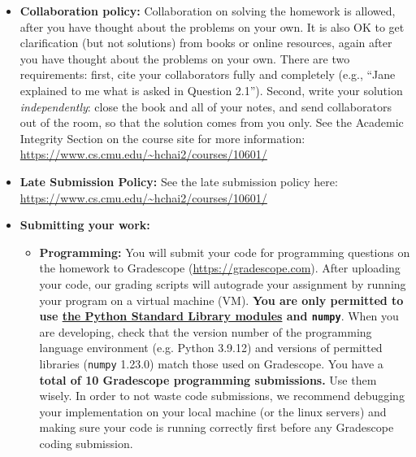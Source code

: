 \documentclass[11pt,addpoints,answers]{exam}
\begin{document}
\begin{itemize}
\item \textbf{Collaboration policy:} Collaboration on solving the homework is allowed, after you have thought about the problems on your own. It is also OK to get clarification (but not solutions) from books or online resources, again after you have thought about the problems on your own. There are two requirements: first, cite your collaborators fully and completely (e.g., ``Jane explained to me what is asked in Question 2.1''). Second, write your solution {\em independently}: close the book and all of your notes, and send collaborators out of the room, so that the solution comes from you only.  See the Academic Integrity Section on the course site for more information: \url{https://www.cs.cmu.edu/~hchai2/courses/10601/}

\item\textbf{Late Submission Policy:} See the late submission policy here: \url{https://www.cs.cmu.edu/~hchai2/courses/10601/}

\item\textbf{Submitting your work:} 

\begin{itemize}


\item \textbf{Programming:} You will submit your code for programming questions on the homework to Gradescope (\url{https://gradescope.com}). After uploading your code, our grading scripts will autograde your assignment by running your program on a virtual machine (VM). \textbf{You are only permitted to use \href{https://docs.python.org/3/library/}{the Python Standard Library modules} and \texttt{numpy}}. When you are developing, check that the version number of the programming language environment (e.g. Python 3.9.12) and versions of permitted libraries (\texttt{numpy} 1.23.0) match those used on Gradescope. You have a \textbf{total of 10 Gradescope programming submissions.} Use them wisely. In order to not waste code submissions, we recommend debugging your implementation on your local machine (or the linux servers) and making sure your code is running correctly first before any Gradescope coding submission.


\end{itemize}
\end{itemize}
\end{document}
